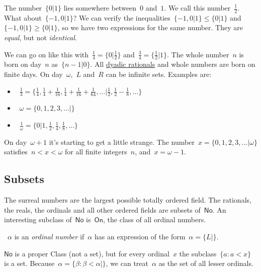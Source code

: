The number~$\{ 0 \vert 1 \}$ lies somewhere between~$0$ and~$1$. We call this number~$\frac{1}{2}$. What about~$\{ -1, 0 \vert 1 \}$? We can verify the inequalities~$\{ -1, 0 \vert 1 \} \leq \{ 0 \vert 1 \}$ and~$\{ -1, 0 \vert 1 \} \geq \{ 0 \vert 1 \}$, so we have two expressions for the same number. They are \emph{equal}, but not \emph{identical}.

We can go on like this with~$\frac{1}{4} = \{ 0 \vert \frac{1}{2} \}$ and~$\frac{3}{4} = \{ \frac{1}{2} \vert 1 \}$. The whole number~$n$ is born on day~$n$ as~$\{ n-1 \vert 0 \}$. All \href{http://en.wikipedia.org/wiki/Dyadic_rational}{dyadic rationals} and whole numbers are born on finite days. On day~$\omega$,~$L$ and~$R$ can be infinite sets. Examples are:
\begin{itemize}
  \item~$\frac{1}{3} = \{ \frac{1}{4}, \frac{1}{4} + \frac{1}{16}, \frac{1}{4} + \frac{1}{16} + \frac{1}{64}, \ldots \vert \frac{1}{2}, \frac{1}{2} - \frac{1}{8}, \ldots \}$
  \item~$\omega = \{ 0, 1, 2, 3, \ldots \vert \}$
  \item~$\frac{1}{\omega} = \{ 0 \vert 1, \frac{1}{2}, \frac{1}{4}, \frac{1}{8}, \ldots \}$
\end{itemize}
On day~$\omega + 1$ it's starting to get a little strange. The number~$x = \{ 0, 1, 2, 3, \ldots \vert \omega \}$ satisfies~$n < x < \omega$ for all finite integers~$n$, and~$x = \omega - 1$.

\subsection{Subsets}
The surreal numbers are the largest possible totally ordered field. The rationals, the reals, the ordinals and all other ordered fields are subsets of~$\textsf{No}$. An interesting subclass of~$\textsf{No}$ is~$\textsf{On}$, the class of all ordinal numbers.

\begin{definition}
 ~$\alpha$ is an \emph{ordinal number} if~$\alpha$ has an expression of the form~$\alpha = \{L\vert \}$.
\end{definition}

$\textsf{No}$ is a proper Class (not a set), but for every ordinal~$x$ the subclass~$\{ a : a < x \}$ is a set. Because~$\alpha = \{ \beta : \beta < \alpha \vert \}$, we can treat~$\alpha$ as the set of all lesser ordinals.
